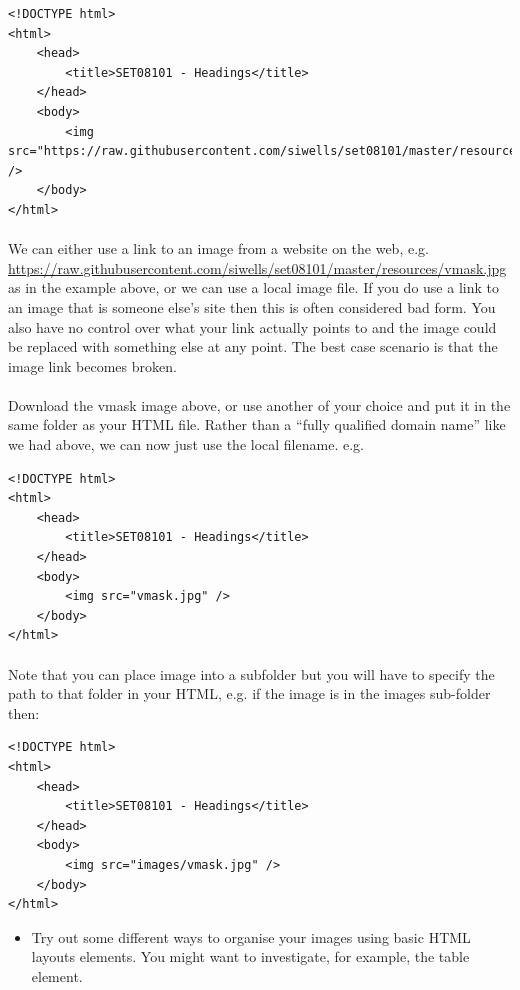 \documentclass[10pt, a4paper, twosize]{article}
\begin{document}
\begin{lstlisting}
<!DOCTYPE html>
<html>
    <head>
        <title>SET08101 - Headings</title>
    </head>
    <body>
        <img src="https://raw.githubusercontent.com/siwells/set08101/master/resources/vmask.jpg" />      
    </body>
</html>
\end{lstlisting}

\paragraph{} We can either use a link to an image from a website on the web, e.g. \url{https://raw.githubusercontent.com/siwells/set08101/master/resources/vmask.jpg} as in the example above, or we can use a local image file. If you do use a link to an image that is someone else's site then this is often considered bad form. You also have no control over what your link actually points to and the image could be replaced with something else at any point. The best case scenario is that the image link becomes broken. 

\paragraph{} Download the vmask image above, or use another of your choice and put it in the same folder as your HTML file. Rather than a ``fully qualified domain name'' like we had above, we can now just use the local filename. e.g.

\begin{lstlisting}
<!DOCTYPE html>
<html>
    <head>
        <title>SET08101 - Headings</title>
    </head>
    <body>
        <img src="vmask.jpg" />      
    </body>
</html>
\end{lstlisting}

\paragraph{} Note that you can place image into a subfolder but you will have to specify the path to that folder in your HTML, e.g. if the image is in the images sub-folder then:

\begin{lstlisting}
<!DOCTYPE html>
<html>
    <head>
        <title>SET08101 - Headings</title>
    </head>
    <body>
        <img src="images/vmask.jpg" /> 
    </body>
</html>
\end{lstlisting}


\begin{itemize}
\item Try out some different ways to organise your images using basic HTML layouts elements. You might want to investigate, for example, the table element.
\end{itemize}
\end{document}
